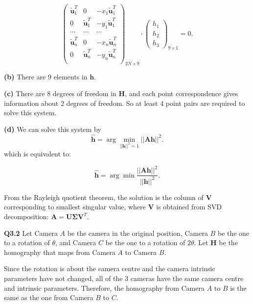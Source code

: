 \documentclass[
  course = {{16-720B Computer Vision}},
  quartile = {{1}},
  assignment = 4\ -\ Feature\ Descriptors\ \&\ Homographies\ \& \  RANSAC,
  name = {{Kangle Deng}},
  email = {{kangled@andrew.cmu.edu}},
  firstexercise = 1
]{aga-homework}
\begin{document}
\begin{equation*}
    \left(
    \begin{array}{ccc}
       \tilde{\mathbf{u}}^T_1  & 0 & -x_1\tilde{\mathbf{u}}^T_1 \\
       0  & \tilde{\mathbf{u}}^T_1 & -y_1\tilde{\mathbf{u}}^T_1 \\
       \cdots & \cdots & \cdots \\
       \tilde{\mathbf{u}}^T_n  & 0 & -x_n\tilde{\mathbf{u}}^T_n \\
       0  & \tilde{\mathbf{u}}^T_n & -y_n\tilde{\mathbf{u}}^T_n \\
    \end{array}
    \right)_{2N \times 9} \cdot \left(
    \begin{array}{c}
         h_1  \\
         h_2 \\
         h_3
    \end{array}
    \right)_{9 \times 1} = 0.
\end{equation*}

\noindent \textbf{(b)} There are 9 elements in $\mathbf{h}$.

\noindent \textbf{(c)} There are 8 degrees of freedom in $\mathbf{H}$, and each point correspondence gives information about 2 degrees of freedom. So at least 4 point pairs are required to solve this system.

\noindent \textbf{(d)} We can solve this system by
\begin{equation*}
    \hat{\mathbf{h}} = \arg\min \limits_{||\mathbf{h}||^2=1} ||\mathbf{A}\mathbf{h}||^2.
\end{equation*}
which is equivalent to:

\begin{equation*}
    \hat{\mathbf{h}} = \arg\min \frac{||\mathbf{A}\mathbf{h}||^2}{||\mathbf{h}||^2}.
\end{equation*}

From the Rayleigh quotient theorem, the solution is the column of $\mathbf{V}$ corresponding to smallest singular value, where $\mathbf{V}$ is obtained from SVD decomposition: $\mathbf{A} = \mathbf{U}\mathbf{\Sigma}\mathbf{V}^T$.

\noindent \textbf{Q3.2} Let Camera $A$ be the camera in the original position, Camera $B$ be the one to a rotation of $\theta$, and Camera $C$ be the one to a rotation of $2\theta$. Let $\mathbf{H}$ be the homography that maps from Camera $A$ to Camera $B$.

Since the rotation is about the camera centre and the camera intrinsic parameters have not changed, all of the 3 cameras have the same camera centre and intrinsic parameters. Therefore, the homography from Camera $A$ to $B$ is the same as the one from Camera $B$ to $C$.
\end{document}
